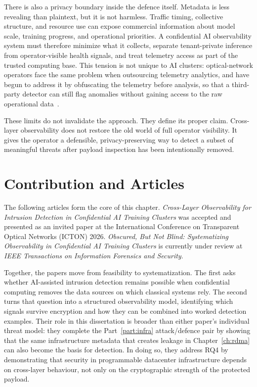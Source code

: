 There is also a privacy boundary inside the defence itself. Metadata is less revealing than plaintext, but it is not harmless. Traffic timing, collective structure, and resource use can expose commercial information about model scale, training progress, and operational priorities. A confidential AI observability system must therefore minimize what it collects, separate tenant-private inference from operator-visible health signals, and treat telemetry access as part of the trusted computing base. This tension is not unique to AI clusters: optical-network operators face the same problem when outsourcing telemetry analytics, and have begun to address it by obfuscating the telemetry before analysis, so that a third-party detector can still flag anomalies without gaining access to the raw operational data~\cite{silva2023confidentiality}.

These limits do not invalidate the approach. They define its proper claim. Cross-layer observability does not restore the old world of full operator visibility. It gives the operator a defensible, privacy-preserving way to detect a subset of meaningful threats after payload inspection has been intentionally removed.

\section{Contribution and Articles}
\label{sec:conf-context}

The following articles form the core of this chapter. \textit{Cross-Layer Observability for Intrusion Detection in Confidential AI Training Clusters} was accepted and presented as an invited paper at the International Conference on Transparent Optical Networks (ICTON) 2026. \textit{Obscured, But Not Blind: Systematizing Observability in Confidential AI Training Clusters} is currently under review at \textit{IEEE Transactions on Information Forensics and Security}.

Together, the papers move from feasibility to systematization. The first asks whether AI-assisted intrusion detection remains possible when confidential computing removes the data sources on which classical systems rely. The second turns that question into a structured observability model, identifying which signals survive encryption and how they can be combined into worked detection examples. Their role in this dissertation is broader than either paper's individual threat model: they complete the Part~\ref{part:infra} attack/defence pair by showing that the same infrastructure metadata that creates leakage in Chapter~\ref{ch:rdma} can also become the basis for detection. In doing so, they address RQ4 by demonstrating that security in programmable datacenter infrastructure depends on cross-layer behaviour, not only on the cryptographic strength of the protected payload.


